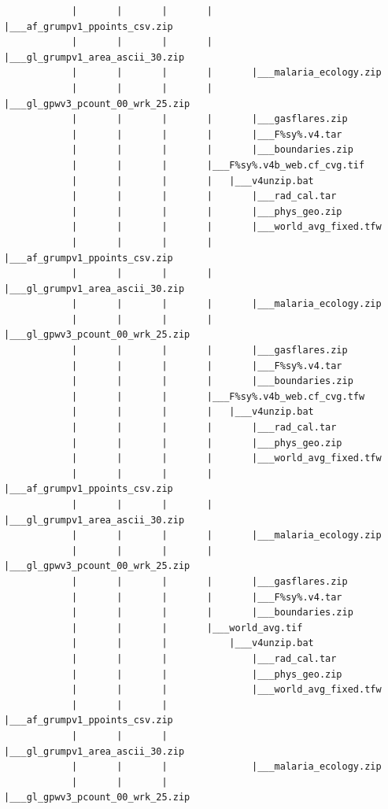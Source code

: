 \documentclass[
]{book}
\begin{document}
\begin{verbatim}
            |       |       |       |       |___af_grumpv1_ppoints_csv.zip
            |       |       |       |       |___gl_grumpv1_area_ascii_30.zip
            |       |       |       |       |___malaria_ecology.zip
            |       |       |       |       |___gl_gpwv3_pcount_00_wrk_25.zip
            |       |       |       |       |___gasflares.zip
            |       |       |       |       |___F%sy%.v4.tar
            |       |       |       |       |___boundaries.zip
            |       |       |       |___F%sy%.v4b_web.cf_cvg.tif
            |       |       |       |   |___v4unzip.bat
            |       |       |       |       |___rad_cal.tar
            |       |       |       |       |___phys_geo.zip
            |       |       |       |       |___world_avg_fixed.tfw
            |       |       |       |       |___af_grumpv1_ppoints_csv.zip
            |       |       |       |       |___gl_grumpv1_area_ascii_30.zip
            |       |       |       |       |___malaria_ecology.zip
            |       |       |       |       |___gl_gpwv3_pcount_00_wrk_25.zip
            |       |       |       |       |___gasflares.zip
            |       |       |       |       |___F%sy%.v4.tar
            |       |       |       |       |___boundaries.zip
            |       |       |       |___F%sy%.v4b_web.cf_cvg.tfw
            |       |       |       |   |___v4unzip.bat
            |       |       |       |       |___rad_cal.tar
            |       |       |       |       |___phys_geo.zip
            |       |       |       |       |___world_avg_fixed.tfw
            |       |       |       |       |___af_grumpv1_ppoints_csv.zip
            |       |       |       |       |___gl_grumpv1_area_ascii_30.zip
            |       |       |       |       |___malaria_ecology.zip
            |       |       |       |       |___gl_gpwv3_pcount_00_wrk_25.zip
            |       |       |       |       |___gasflares.zip
            |       |       |       |       |___F%sy%.v4.tar
            |       |       |       |       |___boundaries.zip
            |       |       |       |___world_avg.tif
            |       |       |           |___v4unzip.bat
            |       |       |               |___rad_cal.tar
            |       |       |               |___phys_geo.zip
            |       |       |               |___world_avg_fixed.tfw
            |       |       |               |___af_grumpv1_ppoints_csv.zip
            |       |       |               |___gl_grumpv1_area_ascii_30.zip
            |       |       |               |___malaria_ecology.zip
            |       |       |               |___gl_gpwv3_pcount_00_wrk_25.zip

\end{verbatim}
\end{document}
